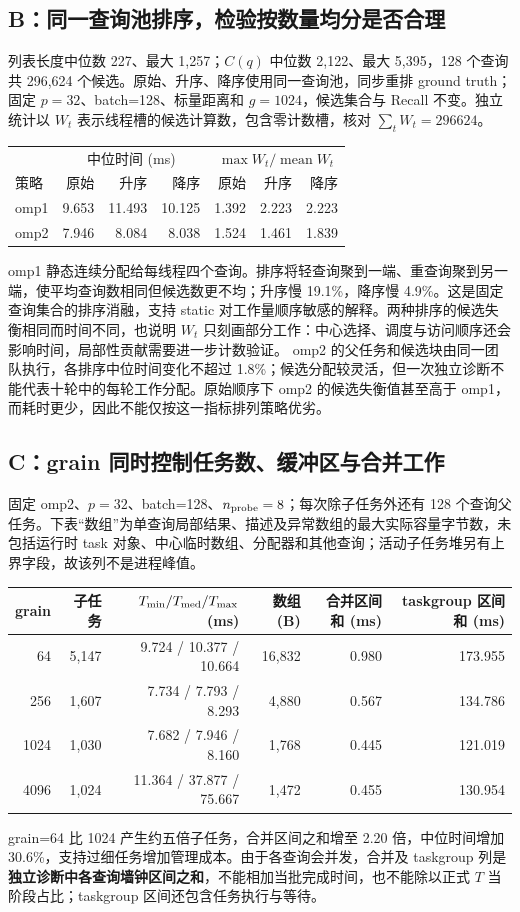 \subsection{B：同一查询池排序，检验按数量均分是否合理}
列表长度中位数 227、最大 1,257；$C(q)$ 中位数 2,122、最大 5,395，128 个查询共 296,624 个候选。原始、升序、降序使用同一查询池，同步重排 ground truth；固定 $p=32$、batch=128、标量距离和 $g=1024$，候选集合与 Recall 不变。独立统计以 $W_t$ 表示线程槽的候选计算数，包含零计数槽，核对 $\sum_tW_t=296624$。
\begin{center}
\smalltable
\begin{tabular}{lrrrrrr}
\toprule
 &\multicolumn{3}{c}{中位时间 (ms)}&\multicolumn{3}{c}{$\max W_t/\operatorname{mean}W_t$}\\
策略&原始&升序&降序&原始&升序&降序\\
\midrule
omp1&9.653&11.493&10.125&1.392&2.223&2.223\\
omp2&7.946&8.084&8.038&1.524&1.461&1.839\\
\bottomrule
\end{tabular}
\end{center}
omp1 静态连续分配给每线程四个查询。排序将轻查询聚到一端、重查询聚到另一端，使平均查询数相同但候选数更不均；升序慢 19.1\%，降序慢 4.9\%。这是固定查询集合的排序消融，支持 static 对工作量顺序敏感的解释。两种排序的候选失衡相同而时间不同，也说明 $W_t$ 只刻画部分工作：中心选择、调度与访问顺序还会影响时间，局部性贡献需要进一步计数验证。
omp2 的父任务和候选块由同一团队执行，各排序中位时间变化不超过 1.8\%；候选分配较灵活，但一次独立诊断不能代表十轮中的每轮工作分配。原始顺序下 omp2 的候选失衡值甚至高于 omp1，而耗时更少，因此不能仅按这一指标排列策略优劣。

\subsection{C：grain 同时控制任务数、缓冲区与合并工作}
固定 omp2、$p=32$、batch=128、$n_{\rm probe}=8$；每次除子任务外还有 128 个查询父任务。下表“数组”为单查询局部结果、描述及异常数组的最大实际容量字节数，未包括运行时 task 对象、中心临时数组、分配器和其他查询；活动子任务堆另有上界字段，故该列不是进程峰值。
\begin{center}
\smalltable
\begin{tabular}{rrrrrr}
\toprule
grain&子任务&$T_{\min}/T_{\rm med}/T_{\max}$ (ms)&数组 (B)&合并区间和 (ms)&taskgroup 区间和 (ms)\\
\midrule
64&5,147&9.724 / 10.377 / 10.664&16,832&0.980&173.955\\
256&1,607&7.734 / 7.793 / 8.293&4,880&0.567&134.786\\
1024&1,030&7.682 / 7.946 / 8.160&1,768&0.445&121.019\\
4096&1,024&11.364 / 37.877 / 75.667&1,472&0.455&130.954\\
\bottomrule
\end{tabular}
\end{center}
grain=64 比 1024 产生约五倍子任务，合并区间之和增至 2.20 倍，中位时间增加 30.6\%，支持过细任务增加管理成本。由于各查询会并发，合并及 taskgroup 列是\textbf{独立诊断中各查询墙钟区间之和}，不能相加当批完成时间，也不能除以正式 $T$ 当阶段占比；taskgroup 区间还包含任务执行与等待。

